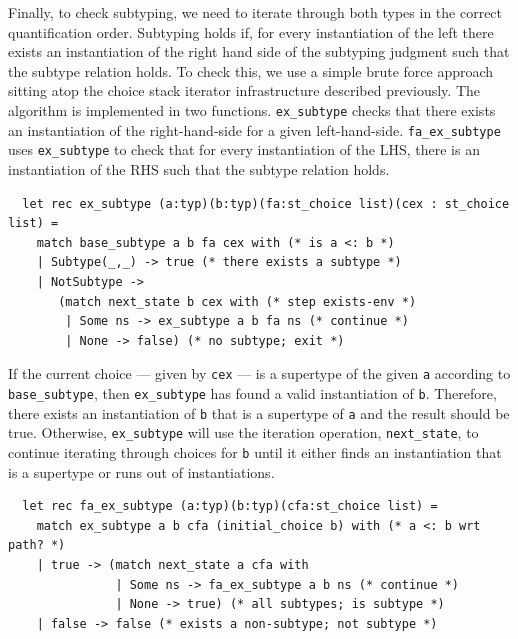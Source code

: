 \documentclass[a4paper,english]{lipics-v2018}
\begin{document}
\par
Finally, to check subtyping, we need to iterate through both types in the 
correct quantification order. Subtyping holds if, for every instantiation 
of the left there exists an instantiation of the right hand side of the
subtyping judgment such that the subtype relation holds. To check this,
we use a simple brute force approach sitting atop the choice stack iterator
infrastructure described previously. The algorithm is implemented in two
functions. \verb|ex_subtype| checks that there exists an instantiation
of the right-hand-side for a given left-hand-side. \verb|fa_ex_subtype|
uses \verb|ex_subtype| to check that for every instantiation of the LHS,
there is an instantiation of the RHS such that the subtype relation
holds.
\par
\begin{small}
\begin{verbatim}
  let rec ex_subtype (a:typ)(b:typ)(fa:st_choice list)(cex : st_choice list) =
    match base_subtype a b fa cex with (* is a <: b *)
    | Subtype(_,_) -> true (* there exists a subtype *)
    | NotSubtype -> 
       (match next_state b cex with (* step exists-env *)
        | Some ns -> ex_subtype a b fa ns (* continue *)
        | None -> false) (* no subtype; exit *)
\end{verbatim}
\end{small}
If the current choice --- given by \verb|cex| --- is a supertype of the given \verb|a| according
to \verb|base_subtype|, then \verb|ex_subtype| has found a valid instantiation of \verb|b|. Therefore,
there exists an instantiation of \verb|b| that is a supertype of \verb|a| and the result should be true.
Otherwise, \verb|ex_subtype| will use the iteration operation, \verb|next_state|, to continue iterating
through choices for \verb|b| until it either finds an instantiation that is a supertype or runs out
of instantiations.

\begin{small}
  \begin{verbatim}
  let rec fa_ex_subtype (a:typ)(b:typ)(cfa:st_choice list) =
    match ex_subtype a b cfa (initial_choice b) with (* a <: b wrt path? *)
    | true -> (match next_state a cfa with
               | Some ns -> fa_ex_subtype a b ns (* continue *)
               | None -> true) (* all subtypes; is subtype *)
    | false -> false (* exists a non-subtype; not subtype *)
\end{verbatim}
\end{small}
\end{document}
